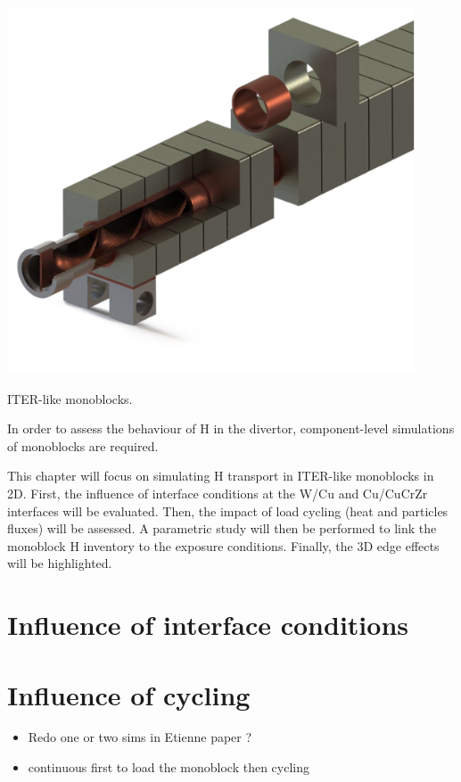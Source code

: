 \begin{marginfigure}
    \centering
    \includegraphics[width=\linewidth]{Figures/Chapter3/monoblocks_with_pipe.png}
    \caption{ITER-like monoblocks.}
    \label{fig: monoblocks with pipe}
\end{marginfigure}

In order to assess the behaviour of H in the divertor, component-level simulations of monoblocks are required.

This chapter will focus on simulating H transport in ITER-like monoblocks in 2D.
First, the influence of interface conditions at the W/Cu and Cu/CuCrZr interfaces will be evaluated.
Then, the impact of load cycling (heat and particles fluxes) will be assessed.
A parametric study will then be performed to link the monoblock H inventory to the exposure conditions.
Finally, the 3D edge effects will be highlighted.

\section{Influence of interface conditions}


\section{Influence of cycling}

\begin{itemize}
    \item Redo one or two sims in Etienne paper ?
    \item continuous first to load the monoblock then cycling
\end{itemize}

